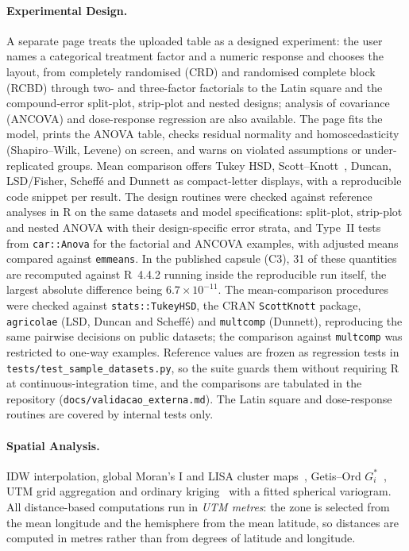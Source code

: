 \documentclass[11pt, letterpaper]{article}
\begin{document}
\paragraph{Experimental Design.} A separate page treats the uploaded table as a designed experiment: the user names a categorical treatment factor and a numeric response and chooses the layout, from completely randomised (CRD) and randomised complete block (RCBD) through two- and three-factor factorials to the Latin square and the compound-error split-plot, strip-plot and nested designs; analysis of covariance (ANCOVA) and dose-response regression are also available. The page fits the model, prints the ANOVA table, checks residual normality and homoscedasticity (Shapiro--Wilk, Levene) on screen, and warns on violated assumptions or under-replicated groups. Mean comparison offers Tukey HSD, Scott--Knott~\cite{ScottKnott1974}, Duncan, LSD/Fisher, Scheff\'e and Dunnett as compact-letter displays, with a reproducible code snippet per result. The design routines were checked against reference analyses in R on the same datasets and model specifications: split-plot, strip-plot and nested ANOVA with their design-specific error strata, and Type~II tests from \texttt{car::Anova} for the factorial and ANCOVA examples, with adjusted means compared against \texttt{emmeans}. In the published capsule (C3), 31 of these quantities are recomputed against R~4.4.2 running inside the reproducible run itself, the largest absolute difference being $6.7\times10^{-11}$. The mean-comparison procedures were checked against \texttt{stats::TukeyHSD}, the CRAN \texttt{ScottKnott} package, \texttt{agricolae} (LSD, Duncan and Scheff\'e) and \texttt{multcomp} (Dunnett), reproducing the same pairwise decisions on public datasets; the comparison against \texttt{multcomp} was restricted to one-way examples. Reference values are frozen as regression tests in \texttt{tests/test\_sample\_datasets.py}, so the suite guards them without requiring R at continuous-integration time, and the comparisons are tabulated in the repository (\texttt{docs/validacao\_externa.md}). The Latin square and dose-response routines are covered by internal tests only.

\paragraph{Spatial Analysis.} IDW interpolation, global Moran's I and LISA cluster maps~\cite{Anselin1995}, Getis--Ord $G_i^*$~\cite{Getis1992}, UTM grid aggregation and ordinary kriging~\cite{Cressie1993} with a fitted spherical variogram. All distance-based computations run in \emph{UTM metres}: the zone is selected from the mean longitude and the hemisphere from the mean latitude, so distances are computed in metres rather than from degrees of latitude and longitude.
\end{document}

